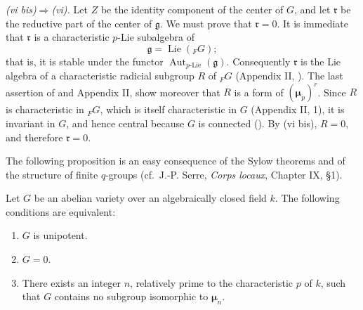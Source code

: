 \medskip\noindent
\textit{(vi bis)\(\Rightarrow\)(vi).}\quad
Let \(Z\) be the identity component of the center of \(G\), and
let \(\mathfrak r\) be the reductive part of the center of
\(\mathfrak g\).  We must prove that \(\mathfrak r=0\).
It is immediate that \(\mathfrak r\) is a characteristic
\(p\)-Lie subalgebra of
\[
  \mathfrak g=\operatorname{Lie}({}_{F}G);
\]
that is, it is stable under the functor
\(\operatorname{Aut}_{p\text{-Lie}}(\mathfrak g)\).
Consequently \(\mathfrak r\) is the Lie algebra of a
characteristic radicial subgroup \(R\) of \({}_{F}G\)
(Appendix II, ).  The last assertion of  and Appendix II,
 show moreover that \(R\) is a form of
\((\boldsymbol\mu_p)^r\).  Since \(R\) is characteristic in
\({}_{F}G\), which is itself characteristic in \(G\)
(Appendix II, 1), it is invariant in \(G\), and hence central
because \(G\) is connected ().  By (vi bis),
\(R=0\), and therefore \(\mathfrak r=0\).


The following proposition is an easy consequence of the Sylow
theorems and of the structure of finite \(q\)-groups
(cf.\ J.-P. Serre, \emph{Corps locaux}, Chapter IX, \S1).



Let \(G\) be an abelian variety over an algebraically closed field
\(k\).  The following conditions are equivalent:
\begin{enumerate}
\item[(i)] 
  \(G\) is unipotent.
\item[(ii)] 
  \(G=0\).
\item[(iii)] 
  There exists an integer \(n\), relatively prime to the
  characteristic \(p\) of \(k\), such that \(G\) contains no
  subgroup isomorphic to \(\boldsymbol\mu_n\).
\end{enumerate}

